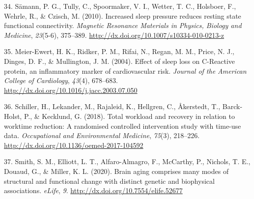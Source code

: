 \documentclass[
  english,
  man, donotrepeattitle]{apa6}
\newlength{\cslhangindent}
\newenvironment{cslreferences}%
  {\setlength{\parindent}{0pt}%
  \everypar{\setlength{\hangindent}{\cslhangindent}}\ignorespaces}%
  {\par}
\begin{document}
\begin{cslreferences}
\leavevmode\hypertarget{ref-Samann2010}{}%
34. Sämann, P. G., Tully, C., Spoormaker, V. I., Wetter, T. C., Holsboer, F., Wehrle, R., \& Czisch, M. (2010). Increased sleep pressure reduces resting state functional connectivity. \emph{Magnetic Resonance Materials in Physics, Biology and Medicine}, \emph{23}(5-6), 375--389. \url{http://dx.doi.org/10.1007/s10334-010-0213-z}

\leavevmode\hypertarget{ref-Meier-Ewert2004}{}%
35. Meier-Ewert, H. K., Ridker, P. M., Rifai, N., Regan, M. M., Price, N. J., Dinges, D. F., \& Mullington, J. M. (2004). Effect of sleep loss on C-Reactive protein, an inflammatory marker of cardiovascular risk. \emph{Journal of the American College of Cardiology}, \emph{43}(4), 678--683. \url{http://dx.doi.org/10.1016/j.jacc.2003.07.050}

\leavevmode\hypertarget{ref-Schiller2018}{}%
36. Schiller, H., Lekander, M., Rajaleid, K., Hellgren, C., Åkerstedt, T., Barck-Holst, P., \& Kecklund, G. (2018). Total workload and recovery in relation to worktime reduction: A randomised controlled intervention study with time-use data. \emph{Occupational and Environmental Medicine}, \emph{75}(3), 218--226. \url{http://dx.doi.org/10.1136/oemed-2017-104592}

\leavevmode\hypertarget{ref-Smith2020}{}%
37. Smith, S. M., Elliott, L. T., Alfaro-Almagro, F., McCarthy, P., Nichols, T. E., Douaud, G., \& Miller, K. L. (2020). Brain aging comprises many modes of structural and functional change with distinct genetic and biophysical associations. \emph{eLife}, \emph{9}. \url{http://dx.doi.org/10.7554/elife.52677}
\end{cslreferences}
\end{document}
